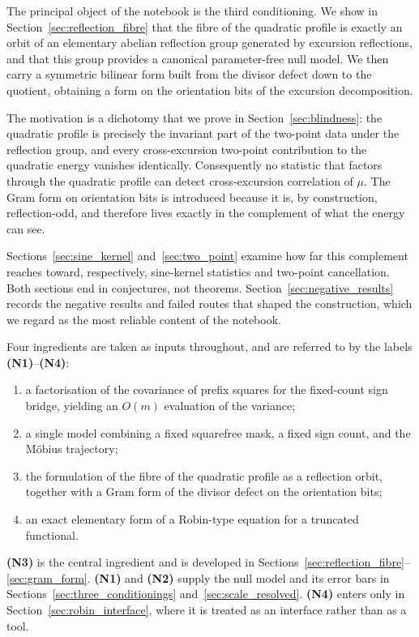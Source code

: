 \documentclass[11pt]{amsart}
\numberwithin{equation}{section}
\theoremstyle{plain}
\theoremstyle{definition}
\theoremstyle{remark}
\begin{document}
The principal object of the notebook is the third conditioning. We show
in Section~\ref{sec:reflection_fibre} that the fibre of the quadratic
profile is exactly an orbit of an elementary abelian reflection group
generated by excursion reflections, and that this group provides a
canonical parameter-free null model. We then carry a symmetric bilinear
form built from the divisor defect down to the quotient, obtaining a
form on the orientation bits of the excursion decomposition.

The motivation is a dichotomy that we prove in
Section~\ref{sec:blindness}: the quadratic profile is precisely the
invariant part of the two-point data under the reflection group, and
every cross-excursion two-point contribution to the quadratic energy
vanishes identically. Consequently no statistic that factors through
the quadratic profile can detect cross-excursion correlation of $\mu$.
The Gram form on orientation bits is introduced because it is, by
construction, reflection-odd, and therefore lives exactly in the
complement of what the energy can see.

Sections~\ref{sec:sine_kernel} and~\ref{sec:two_point} examine how far
this complement reaches toward, respectively, sine-kernel statistics
and two-point cancellation. Both sections end in conjectures, not
theorems. Section~\ref{sec:negative_results} records the negative
results and failed routes that shaped the construction, which we regard
as the most reliable content of the notebook.

Four ingredients are taken as inputs throughout, and are referred to by
the labels \textbf{(N1)}--\textbf{(N4)}:

\begin{enumerate}[label=\textbf{(N\arabic*)}]
\item a factorisation of the covariance of prefix squares for the
fixed-count sign bridge, yielding an $O(m)$ evaluation of the variance;
\item a single model combining a fixed squarefree mask, a fixed sign
count, and the M\"obius trajectory;
\item the formulation of the fibre of the quadratic profile as a
reflection orbit, together with a Gram form of the divisor defect on
the orientation bits;
\item an exact elementary form of a Robin-type equation for a truncated
functional.
\end{enumerate}

\textbf{(N3)} is the central ingredient and is developed in
Sections~\ref{sec:reflection_fibre}--\ref{sec:gram_form}.
\textbf{(N1)} and \textbf{(N2)} supply the null model and its error
bars in Sections~\ref{sec:three_conditionings}
and~\ref{sec:scale_resolved}. \textbf{(N4)} enters only in
Section~\ref{sec:robin_interface}, where it is treated as an interface
rather than as a tool.
\end{document}
